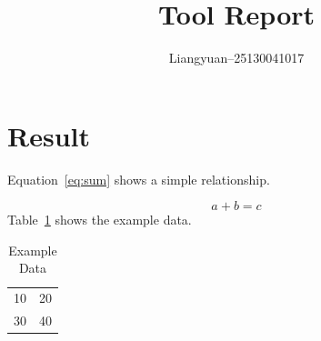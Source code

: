 \documentclass{article}
\begin{document}
\title{Tool Report}
\author{Liangyuan--25130041017}
\maketitle
\section{Result}
Equation~\eqref{eq:sum} shows a simple relationship.

\begin{equation}
a + b = c
\label{eq:sum}
\end{equation}
Table~\ref{tab:data} shows the example data.

\begin{table}[h]
\centering
\caption{Example Data}
\label{tab:data}
\begin{tabular}{cc}
10 & 20 \\
30 & 40 \\
\end{tabular}
\end{table}
\end{document}
